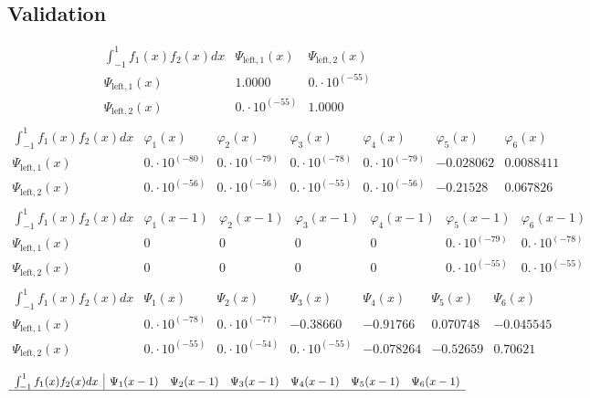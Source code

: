 \documentclass{article}
\begin{document}
 \begin{landscape}
 \subsection{Validation}$$ \begin{array}{l|ll}
\int_{-1}^1 f_1(x)f_2(x) dx& \Psi_{\text{left},1}(x)& \Psi_{\text{left},2}(x) \\ \hline 
 \Psi_{\text{left},1}(x) & 1.0000 & 0.\cdot 10^{(-55)} \\ 
\Psi_{\text{left},2}(x) & 0.\cdot 10^{(-55)} & 1.0000 \\ 
\end{array} $$
$$ \begin{array}{l|llllll}
\int_{-1}^1 f_1(x)f_2(x) dx& \varphi_1(x)& \varphi_2(x)& \varphi_3(x)& \varphi_4(x)& \varphi_5(x)& \varphi_6(x) \\ \hline 
 \Psi_{\text{left},1}(x) & 0.\cdot 10^{(-80)} & 0.\cdot 10^{(-79)} & 0.\cdot 10^{(-78)} & 0.\cdot 10^{(-79)} & -0.028062 & 0.0088411 \\ 
\Psi_{\text{left},2}(x) & 0.\cdot 10^{(-56)} & 0.\cdot 10^{(-56)} & 0.\cdot 10^{(-55)} & 0.\cdot 10^{(-56)} & -0.21528 & 0.067826 \\ 
\end{array} $$ 
$$ \begin{array}{l|llllll}
\int_{-1}^1 f_1(x)f_2(x) dx& \varphi_1(x-1)& \varphi_2(x-1)& \varphi_3(x-1)& \varphi_4(x-1)& \varphi_5(x-1)& \varphi_6(x-1) \\ \hline 
 \Psi_{\text{left},1}(x) & 0 & 0 & 0 & 0 & 0.\cdot 10^{(-79)} & 0.\cdot 10^{(-78)} \\ 
\Psi_{\text{left},2}(x) & 0 & 0 & 0 & 0 & 0.\cdot 10^{(-55)} & 0.\cdot 10^{(-55)} \\ 
\end{array} $$ 
$$ \begin{array}{l|llllll}
\int_{-1}^1 f_1(x)f_2(x) dx& \Psi_1(x)& \Psi_2(x)& \Psi_3(x)& \Psi_4(x)& \Psi_5(x)& \Psi_6(x) \\ \hline 
 \Psi_{\text{left},1}(x) & 0.\cdot 10^{(-78)} & 0.\cdot 10^{(-77)} & -0.38660 & -0.91766 & 0.070748 & -0.045545 \\ 
\Psi_{\text{left},2}(x) & 0.\cdot 10^{(-55)} & 0.\cdot 10^{(-54)} & 0.\cdot 10^{(-55)} & -0.078264 & -0.52659 & 0.70621 \\ 
\end{array} $$ 
$$ \begin{array}{l|llllll}
\int_{-1}^1 f_1(x)f_2(x) dx& \Psi_1(x-1)& \Psi_2(x-1)& \Psi_3(x-1)& \Psi_4(x-1)& \Psi_5(x-1)& \Psi_6(x-1) \\ \hline 

\end{array}$$
\end{landscape}
\end{document}
